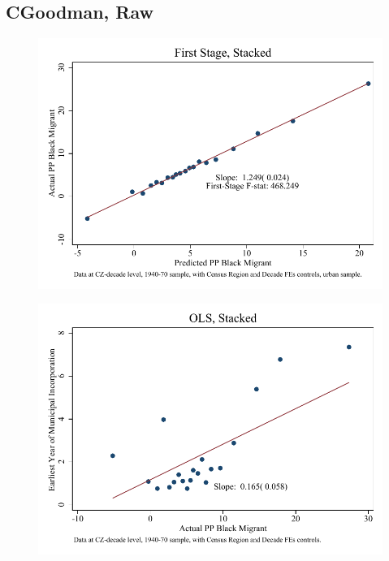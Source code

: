 \documentclass{article}
\begin{document}
\subsection{CGoodman, Raw}

\clearpage
\begin{figure}
\centering
\includegraphics{figures/simplefigs/stacked_cgoodman_raw_C3_urban_fs.pdf}
\end{figure}
\clearpage
\begin{figure}
\centering
\includegraphics{figures/simplefigs/stacked_cgoodman_raw_C3_urban_ols.pdf}
\end{figure}
\clearpage
\end{document}
